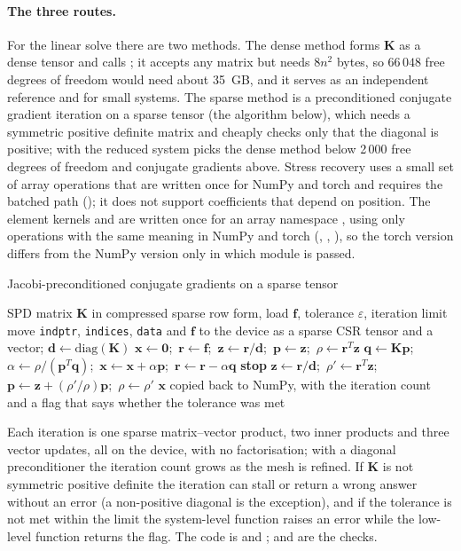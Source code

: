\paragraph{The three routes.} For the linear solve there are two methods. The dense method forms $\bm K$ as a dense tensor and calls ; it accepts any matrix but needs $8n^2$ bytes, so $66\,048$ free degrees of freedom would need about 35~GB, and it serves as an independent reference and for small systems. The sparse method is a preconditioned conjugate gradient iteration on a sparse tensor (the algorithm below), which needs a symmetric positive definite matrix and cheaply checks only that the diagonal is positive; with  the reduced system picks the dense method below 2\,000 free degrees of freedom and conjugate gradients above. Stress recovery uses a small set of array operations that are written once for NumPy and torch and requires the batched path (); it does not support coefficients that depend on position. The element kernels  and  are written once for an array namespace , using only operations with the same meaning in NumPy and torch (, , ), so the torch version differs from the NumPy version only in which module is passed.

\begin{algbox}{Jacobi-preconditioned conjugate gradients on a sparse tensor}
\begin{pseudo}
\Require SPD matrix $\bm K$ in compressed sparse row form, load $\bm f$, tolerance $\varepsilon$, iteration limit
\State move \texttt{indptr}, \texttt{indices}, \texttt{data} and $\bm f$ to the device as a sparse CSR tensor and a vector; $\bm d\gets\mathrm{diag}(\bm K)$
\State $\bm x\gets\bm 0$;\ $\bm r\gets\bm f$;\ $\bm z\gets\bm r/\bm d$;\ $\bm p\gets\bm z$;\ $\rho\gets\bm r^T\bm z$
  \State $\bm q\gets\bm K\bm p$;\ $\alpha\gets\rho/(\bm p^T\bm q)$;\ $\bm x\gets\bm x+\alpha\bm p$;\ $\bm r\gets\bm r-\alpha\bm q$
   \textbf{stop} \EndIf
  \State $\bm z\gets\bm r/\bm d$;\ $\rho'\gets\bm r^T\bm z$;\ $\bm p\gets\bm z+(\rho'/\rho)\bm p$;\ $\rho\gets\rho'$
\EndFor
\Ensure $\bm x$ copied back to NumPy, with the iteration count and a flag that says whether the tolerance was met
\end{pseudo}
\end{algbox}

Each iteration is one sparse matrix--vector product, two inner products and three vector updates, all on the device, with no factorisation; with a diagonal preconditioner the iteration count grows as the mesh is refined. If $\bm K$ is not symmetric positive definite the iteration can stall or return a wrong answer without an error (a non-positive diagonal is the exception), and if the tolerance is not met within the limit the system-level function raises an error while the low-level function returns the flag. The code is  and ;  and  are the checks.

